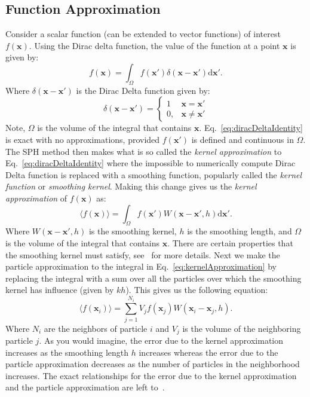 \documentclass{article}
\newcommand{\vx}{\mathbf{x}}
\newcommand{\dd}{\mathrm{d}}
\begin{document}
\subsection*{Function Approximation}
Consider a scalar function (can be extended to vector functions) of interest $f(\vx)$. Using the Dirac delta function, the value of the function at a point $\vx$ is given by:
\begin{equation}
  \label{eq:diracDeltaIdentity}
  f(\vx) = \int_\Omega f(\vx') \delta(\vx - \vx') \dd{\vx'}.
\end{equation}
Where $\delta(\vx - \vx')$ is the Dirac Delta function given by:
\begin{equation}
  \delta(\vx - \vx') = \begin{cases}
      1 & \vx = \vx' \\
      0, & \vx \neq \vx'
  \end{cases}
\end{equation}
Note, $\Omega$ is the volume of the integral that contains $\vx$. Eq.~\ref{eq:diracDeltaIdentity} is exact with no approximations, provided $f(\vx')$ is defined and continuous in $\Omega$. 
The SPH method then makes what is so called the \textit{kernel approximation} to Eq.~\ref{eq:diracDeltaIdentity} where the impossible to numerically compute Dirac Delta function is replaced with a smoothing function, popularly called the \textit{kernel function} or \textit{smoothing kernel}. Making this change gives us the \textit{kernel approximation} of $f(\vx)$ as:
\begin{equation}
    \label{eq:kernelApproximation}
    \langle f(\vx) \rangle = \int_\Omega f(\vx') W(\vx - \vx', h) \dd{\vx'}.
\end{equation}
Where $W(\vx - \vx', h)$ is the smoothing kernel, $h$ is the smoothing length, and $\Omega$ is the volume of the integral that contains $\vx$. There are certain properties that the smoothing kernel must satisfy, see~\citep{liu2010sph} for more details.  
Next we make the particle approximation to the integral in Eq.~\ref{eq:kernelApproximation} by replacing the integral with a sum over all the particles over which the smoothing kernel has influence (given by $kh$). This gives us the following equation:
\begin{equation}
    \label{eq:particleApproximation}
    \langle f(\vx_i) \rangle = \sum_{j=1}^{N_i} V_j f(\vx_j) W(\vx_i - \vx_j, h).
\end{equation}
Where $N_i$ are the neighbors of particle $i$ and $V_j$ is the volume of the neighboring particle $j$. As you would imagine, the error due to the kernel approximation increases as the smoothing length $h$ increases whereas the error due to the particle approximation decreases as the number of particles in the neighborhood increases. The exact relationships for the error due to the kernel approximation and the particle approximation are left to~\citep{liu2010sph}.
\end{document}
